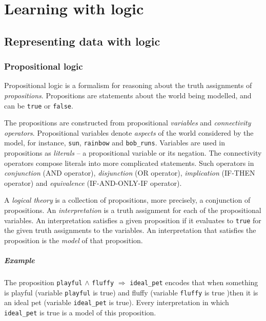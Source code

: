 \chapter{Learning with logic}\label{ch:learninglogic}





\section{Representing data with logic}





\subsection{Propositional logic}

Propositional logic is a formalism for reasoning about the truth assignments of \textit{propositions}.
Propositions are statements about the world being modelled, and can be \texttt{true} or \texttt{false}.


The propositions are constructed from propositional \textit{variables} and \textit{connectivity operators}.
Propositional variables denote \textit{aspects} of the world considered by the model, for instance, \texttt{sun}, \texttt{rainbow} and \texttt{bob\_runs}.
Variables are used in propositions as \textit{literals} -- a propositional variable or its negation.
The connectivity operators compose literals into more complicated statements.
Such operators in \textit{conjunction} (AND operator), \textit{disjunction} (OR operator), \textit{implication} (IF-THEN operator) and \textit{equivalence} (IF-AND-ONLY-IF	operator).


A \textit{logical theory} is a collection of propositions, more precisely, a conjunction of propositions.
An \textit{interpretation} is a truth assignment for each of the propositional variables.
An interpretation satisfies a given proposition if it evaluates to \texttt{true} for the given truth assignments to the variables.
An interpretation that satisfies the proposition is the \textit{model} of that proposition.



\paragraph{Example} The proposition \texttt{playful} $\wedge$ \texttt{fluffy} $\Rightarrow$ \texttt{ideal\_pet} encodes that when something is playful (variable \texttt{playful} is true) and fluffy (variable \texttt{fluffy} is true )then it is an ideal pet (variable \texttt{ideal\_pet} is true).
Every interpretation in which \texttt{ideal\_pet} is true is a model of this proposition.




